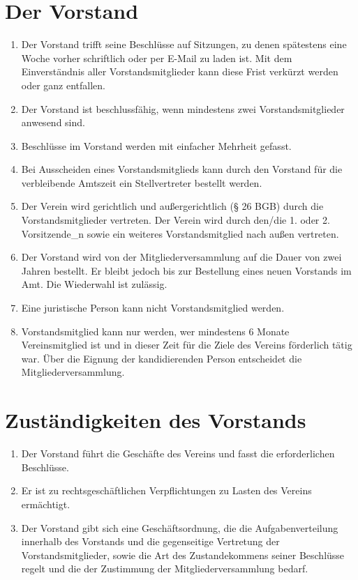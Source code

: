 \documentclass[a4paper, 12pt]{scrartcl}
\begin{document}
\section{Der Vorstand}
\label{der-vorstand}
\begin{enumerate}
\item Der Vorstand trifft seine Beschlüsse auf Sitzungen, zu denen spätestens eine Woche vorher schriftlich oder per E-Mail zu laden ist. Mit dem Einverständnis aller Vorstandsmitglieder kann diese Frist verkürzt werden oder ganz entfallen.
	\item Der Vorstand ist beschlussfähig, wenn mindestens zwei Vorstandsmitglieder anwesend sind.
	\item Beschlüsse im Vorstand werden mit einfacher Mehrheit gefasst.
	\item Bei Ausscheiden eines Vorstandsmitglieds kann durch den Vorstand für die verbleibende Amtszeit ein Stellvertreter bestellt werden.
	\item \label{der-vorstand-vertretung} Der Verein wird gerichtlich und außergerichtlich (§ 26 BGB) durch die Vorstandsmitglieder vertreten. Der Verein wird durch den/die 1. oder 2. Vorsitzende\_n sowie ein weiteres Vorstandsmitglied nach außen vertreten.
	\item Der Vorstand wird von der Mitgliederversammlung auf die Dauer von zwei Jahren bestellt. Er bleibt jedoch bis zur Bestellung eines neuen Vorstands im Amt. Die Wiederwahl ist zulässig.
	\item Eine juristische Person kann nicht Vorstandsmitglied werden.
	\item \label{der-vorstand-zugehoerigkeit}Vorstandsmitglied kann nur werden, wer mindestens 6 Monate Vereinsmitglied ist und in dieser Zeit für die Ziele des Vereins förderlich
tätig war. Über die Eignung der kandidierenden Person entscheidet die Mitgliederversammlung.
\end{enumerate}

\section{Zuständigkeiten des Vorstands}
\begin{enumerate}
	\item Der Vorstand führt die Geschäfte des Vereins und fasst die erforderlichen Beschlüsse.
	\item Er ist zu rechtsgeschäftlichen Verpflichtungen zu Lasten des Vereins ermächtigt.
	\item Der Vorstand gibt sich eine Geschäftsordnung, die die Aufgabenverteilung innerhalb des Vorstands und die gegenseitige Vertretung der Vorstandsmitglieder, sowie die Art des Zustandekommens seiner Beschlüsse regelt und die der Zustimmung der Mitgliederversammlung bedarf.
\end{enumerate}
\end{document}
